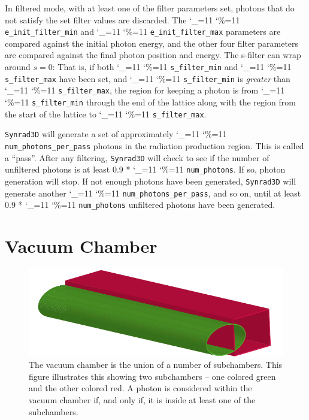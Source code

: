 \documentclass[11pt,openany]{report}
\newcommand{\srthree}{\texttt{Synrad3D}\xspace}
\newcommand\ttcmd{\begingroup\catcode`\_=11 \catcode`\%=11 \dottcmd}
\newcommand\dottcmd[1]{\texttt{#1}\endgroup}
\newcommand{\vn}{\ttcmd}
\begin{document}
In filtered mode, with at least one of the filter parameters set,
photons that do not satisfy the set filter values are discarded. The
\vn{e_init_filter_min} and \vn{e_init_filter_max} parameters are 
compared against the initial photon energy, and the other four
filter parameters are compared against the final photon position and
energy. The s-filter can wrap around $s = 0$: That is,
if both \vn{s_filter_min} and \vn{s_filter_max} have been set,
and \vn{s_filter_min} is {\em greater} than \vn{s_filter_max}, the region
for keeping a photon is from \vn{s_filter_min} through the end of the
lattice along with the region from the start of the lattice to
\vn{s_filter_max}.

\srthree will generate a set of approximately
\vn{num_photons_per_pass} photons in the radiation production region.
This is called a ``pass''.  After any filtering, \srthree will check
to see if the number of unfiltered photons is at least 0.9 *
\vn{num_photons}. If so, photon generation will stop. If not enough
photons have been generated, \srthree will generate another
\vn{num_photons_per_pass}, and so on, until at least 0.9 *
\vn{num_photons} unfiltered photons have been generated.

\chapter{Vacuum Chamber} 
\label{s:vac.chamber}

\begin{figure}[bt]
\begin{center}
\includegraphics[width=5in]{vac-pipe.pdf} \caption[The vacuum chamber is the union of a
number of subchambers.]{The vacuum chamber is the union of a number of subchambers.
This figure illustrates this showing two subchambers -- one colored green and the other
colored red. A photon is considered within the vacuum chamber if, and only if, it is
inside at least one of the subchambers.}
\label{f:vac-chamber}
\end{center}
\end{figure}
\end{document}
